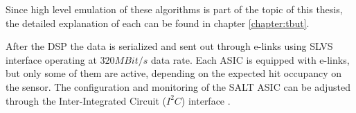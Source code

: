 Since high level emulation of these algorithms is part of the topic of this thesis, the detailed explanation of each can be found in chapter \ref{chapter:tbut}. 

After the DSP the data is serialized and sent out through e-links using SLVS interface \cite{SLVS} operating at $320 MBit/s$ data rate. Each ASIC is equipped with  e-links, but only some of them are active, depending on the expected hit occupancy on the sensor.  The configuration and monitoring of the SALT ASIC can be adjusted through the Inter-Integrated
Circuit ($I^{2}C$) interface \cite{i2c}.  

